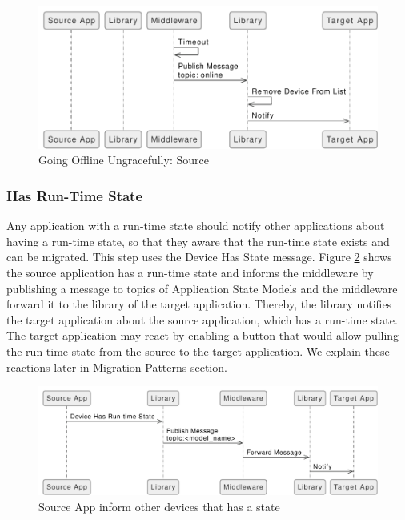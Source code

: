 \FloatBarrier \begin{figure}[H]
    \includegraphics[width=\linewidth]{../figures/Going-Offline-Ungraceful-Source.pdf}
    \centering
    \caption{Going Offline Ungracefully: Source}
    \label{fig:Going-Offline-Ungraceful-Source}
\end{figure} \FloatBarrier

\subsubsection{Has Run-Time State}
Any application with a run-time state should notify other applications about having a run-time state, so that they aware that the run-time state exists and can be migrated. This step uses the Device Has State message. Figure \ref{fig:Inform-Devices-Has-State-Source} shows the source application has a run-time state and informs the middleware by publishing a message to topics of Application State Models and the middleware forward it to the library of the target application. Thereby, the library notifies the target application about the source application, which has a run-time state. The target application may react by enabling a button that would allow pulling the run-time state from the source to the target application. We explain these reactions later in Migration Patterns section.

\FloatBarrier \begin{figure}[H]
    \includegraphics[width=\linewidth]{../figures/Inform-Devices-Has-State-Source.pdf}
    \centering
    \caption{Source App inform other devices that has a state}
    \label{fig:Inform-Devices-Has-State-Source}
\end{figure} \FloatBarrier

